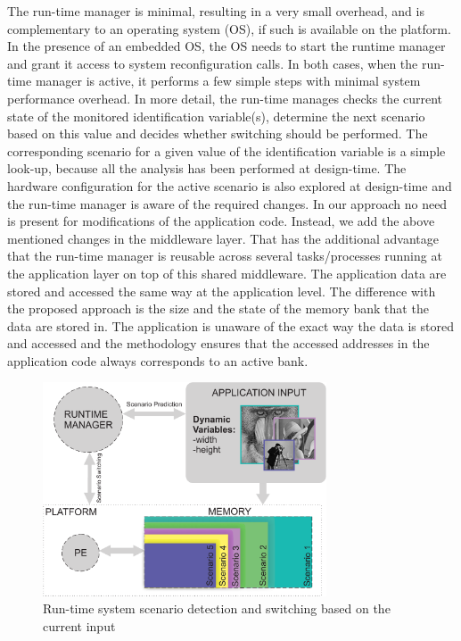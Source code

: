 The run-time manager is minimal, resulting in a very small overhead, and is complementary to an operating system (OS), if such is available on the platform. 
In the presence of an embedded OS, the OS needs to start the runtime manager and grant it access to system reconfiguration calls. 
In both cases, when the run-time manager is active, it performs a few simple steps with minimal system performance overhead. 
In more detail, the run-time manages checks the current state of the monitored identification variable(s), determine the next scenario based on this value and decides whether switching should be performed. 
The corresponding scenario for a given value of the identification variable is a simple look-up, because all the analysis has been performed at design-time. 
The hardware configuration for the active scenario is also explored at design-time and the run-time manager is aware of the required changes. 
In our approach no need is present for modifications of the application code.
Instead, we add the above mentioned changes in the middleware layer. 
That has the additional advantage that the run-time manager is reusable across several tasks/processes running at the application layer on top of this shared middleware. 
The application data are stored and accessed the same way at the application level. 
The difference with the proposed approach is the size and the state of the memory bank that the data are stored in. 
The application is unaware of the exact way the data is stored and accessed and the methodology ensures that the accessed addresses in the application code always corresponds to an active bank.

\begin{figure}
\centering
\includegraphics[width=0.75\textwidth]{C/switching.pdf}
\caption{Run-time system scenario detection and switching based on the current input}
\label{fig:runtimeC}
\end{figure}


